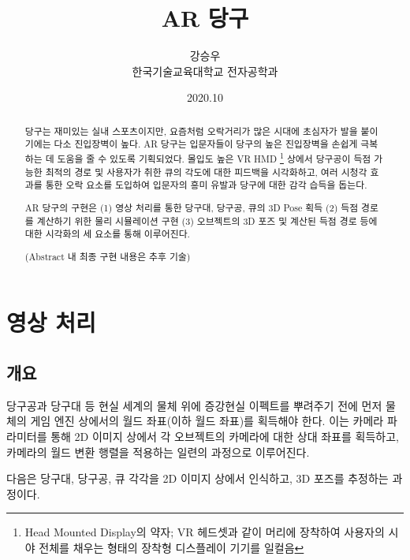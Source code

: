 \documentclass[11pt]{oblivoir}
\title{AR 당구}
\author{강승우 \\ 한국기술교육대학교 전자공학과}
\date{2020.10}
\begin{document}
\maketitle

\setlength{\parindent}{0.3cm}




\begin{abstract}

        당구는 재미있는 실내 스포츠이지만, 요즘처럼 오락거리가 많은 시대에 초심자가 발을 붙이기에는 다소 진입장벽이 높다. AR 당구는 입문자들이 당구의 높은 진입장벽을 손쉽게 극복하는 데 도움을 줄 수 있도록 기획되었다. 몰입도 높은 VR HMD
        \footnote{Head Mounted Display의 약자; VR 헤드셋과 같이 머리에 장착하여 사용자의 시야 전체를 채우는 형태의 장착형 디스플레이 기기를 일컬음}
        상에서 당구공이 득점 가능한 최적의 경로 및 사용자가 취한 큐의 각도에 대한 피드백을 시각화하고, 여러 시청각 효과를 통한 오락 요소를 도입하여 입문자의 흥미 유발과 당구에 대한 감각 습득을 돕는다.

        AR 당구의 구현은 (1) 영상 처리를 통한 당구대, 당구공, 큐의 3D Pose 획득 (2) 득점 경로를 계산하기 위한 물리 시뮬레이션 구현 (3) 오브젝트의 3D 포즈 및 계산된 득점 경로 등에 대한 시각화의 세 요소를 통해 이루어진다.

        (Abstract 내 최종 구현 내용은 추후 기술)
\end{abstract}

\newpage




\section{영상 처리}
\subsection{개요}

당구공과 당구대 등 현실 세계의 물체 위에 증강현실 이펙트를 뿌려주기 전에 먼저 물체의 게임 엔진 상에서의 월드 좌표(이하 월드 좌표)를 획득해야 한다. 이는 카메라 파라미터를 통해 2D 이미지 상에서 각 오브젝트의 카메라에 대한 상대 좌표를 획득하고, 카메라의 월드 변환 행렬을 적용하는 일련의 과정으로 이루어진다.

다음은 당구대, 당구공, 큐 각각을 2D 이미지 상에서 인식하고, 3D 포즈를 추정하는 과정이다.
\end{document}
